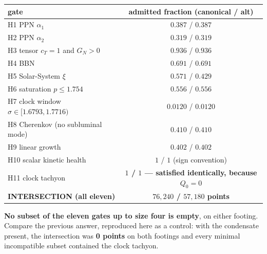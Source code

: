 \documentclass[11pt,letterpaper]{article}
\begin{document}
\begin{center}
\begin{tabular}{lc}\toprule
gate & admitted fraction (canonical / alt)\\\midrule
H1 PPN $\alpha_1$ & $0.387$ / $0.387$\\
H2 PPN $\alpha_2$ & $0.319$ / $0.319$\\
H3 tensor $c_T=1$ and $G_N>0$ & $0.936$ / $0.936$\\
H4 BBN & $0.691$ / $0.691$\\
H5 Solar-System $\xi$ & $0.571$ / $0.429$\\
H6 saturation $p\le1.754$ & $0.556$ / $0.556$\\
H7 clock window $\sigma\in[1.6793,1.7716)$ & $0.0120$ / $0.0120$\\
H8 Cherenkov (no subluminal mode) & $0.410$ / $0.410$\\
H9 linear growth & $0.402$ / $0.402$\\
H10 scalar kinetic health & $1$ / $1$ (sign convention)\\
H11 clock tachyon & \textbf{$1$ / $1$ --- satisfied identically, because $Q_0=0$}\\\midrule
\textbf{INTERSECTION (all eleven)} & \textbf{$76{,}240$ / $57{,}180$ points}\\\bottomrule
\end{tabular}
\end{center}

\textbf{No subset of the eleven gates up to size four is empty}, on either footing. Compare the previous answer, reproduced here as a control: with the condensate present, the intersection was \textbf{0 points} on both footings and every minimal incompatible subset contained the clock tachyon.
\end{document}
